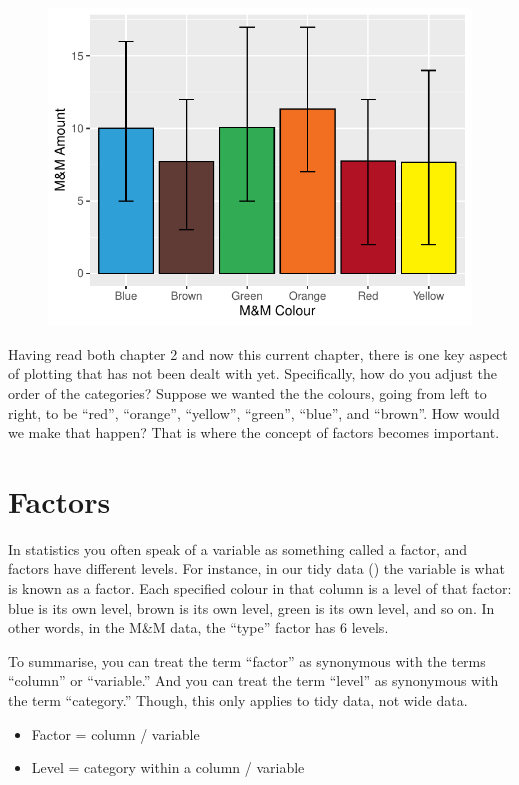 \begin{figure}[H]
\includegraphics[scale = .75]{graphics/ch3Figs/bar_4.pdf}
\end{figure}

Having read both chapter 2 and now this current chapter, there is one key aspect of plotting that has not been dealt with yet. Specifically, how do you adjust the order of the categories? Suppose we wanted the the colours, going from left to right, to be ``red'', ``orange'', ``yellow'', ``green'', ``blue'', and ``brown''. How would we make that happen? That is where the concept of factors becomes important.

\section{Factors}

In statistics you often speak of a variable as something called a \gls{factor}, and factors have different \glspl{level}.  For instance, in our tidy data () the variable  is what is known as a factor. Each specified colour in that column is a level of that factor: blue is its own  level, brown is its own level, green is its own level, and so on. In other words, in the M\&M data, the ``type'' factor has 6 levels.

To summarise, you can treat the term ``factor'' as synonymous with the terms ``column'' or ``variable.'' And you can treat the term ``level'' as synonymous with the term ``category.'' Though, this only applies to tidy data, not wide data.
{
\begin{itemize}
  \setlength\itemsep{-1em}
    \item Factor = column / variable
    \item Level = category within a column / variable
\end{itemize}
}

